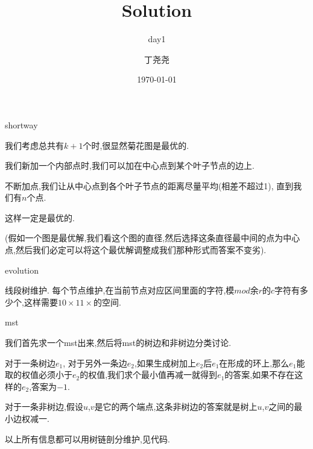 \documentclass[11pt,serif]{beamer}
\begin{document}
	\author{丁尧尧}
	\title{Solution}
	\subtitle{day1}
	\date{\today}
	
	\begin{frame}[plain]
		\maketitle
	\end{frame}

	\begin{frame}{shortway}
		\begin{solution}
			我们考虑总共有$k+1$个时,很显然菊花图是最优的.
			
			我们新加一个内部点时,我们可以加在中心点到某个叶子节点的边上.
			
			不断加点,我们让从中心点到各个叶子节点的距离尽量平均(相差不超过1), 直到我们有$n$个点.
			
			这样一定是最优的. 
			
			(假如一个图是最优解,我们看这个图的直径,然后选择这条直径最中间的点为中心点,然后我们必定可以将这个最优解调整成我们那种形式而答案不变劣).
		\end{solution}
	\end{frame}

	\begin{frame}{evolution} 
		\begin{solution}
			线段树维护. 每个节点维护,在当前节点对应区间里面的字符,模$mod$余$r$的$c$字符有多少个,这样需要$10 \times 11 \times$的空间.
		\end{solution}	
	\end{frame}

	\begin{frame}{mst}
		\begin{solution}
			我们首先求一个mst出来,然后将mst的树边和非树边分类讨论.
			
			
			对于一条树边$e_1$, 对于另外一条边$e_2$,如果生成树加上$e_2$后$e_1$在形成的环上,那么$e_1$能取的权值必须小于$e_2$的权值,我们求个最小值再减一就得到$e_1$的答案,如果不存在这样的$e_2$,答案为$-1$.
			
			
			对于一条非树边,假设$u$,$v$是它的两个端点,这条非树边的答案就是树上$u$,$v$之间的最小边权减一.
			
			
			以上所有信息都可以用树链剖分维护,见代码.
		\end{solution}
	\end{frame} 
\end{document}
